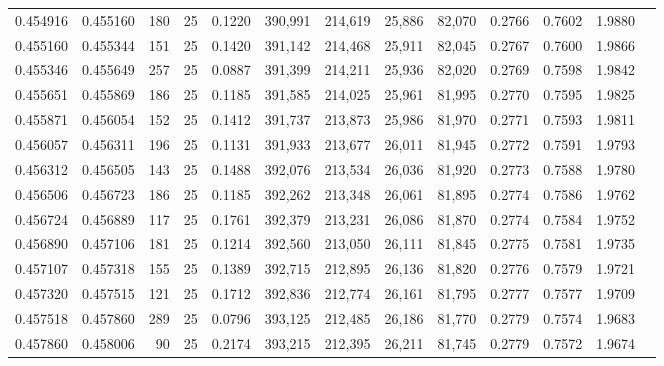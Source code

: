 \begin{tabular}{rrrrrrrrrrrrr}
0.454916 & 0.455160 &   180 &  25 &                                     0.1220 & 390,991 & 214,619 &  25,886 &  82,070 & 0.2766 & 0.7602 & 1.9880 \\
0.455160 & 0.455344 &   151 &  25 &                                     0.1420 & 391,142 & 214,468 &  25,911 &  82,045 & 0.2767 & 0.7600 & 1.9866 \\
0.455346 & 0.455649 &   257 &  25 &                                     0.0887 & 391,399 & 214,211 &  25,936 &  82,020 & 0.2769 & 0.7598 & 1.9842 \\
0.455651 & 0.455869 &   186 &  25 &                                     0.1185 & 391,585 & 214,025 &  25,961 &  81,995 & 0.2770 & 0.7595 & 1.9825 \\
0.455871 & 0.456054 &   152 &  25 &                                     0.1412 & 391,737 & 213,873 &  25,986 &  81,970 & 0.2771 & 0.7593 & 1.9811 \\
0.456057 & 0.456311 &   196 &  25 &                                     0.1131 & 391,933 & 213,677 &  26,011 &  81,945 & 0.2772 & 0.7591 & 1.9793 \\
0.456312 & 0.456505 &   143 &  25 &                                     0.1488 & 392,076 & 213,534 &  26,036 &  81,920 & 0.2773 & 0.7588 & 1.9780 \\
0.456506 & 0.456723 &   186 &  25 &                                     0.1185 & 392,262 & 213,348 &  26,061 &  81,895 & 0.2774 & 0.7586 & 1.9762 \\
0.456724 & 0.456889 &   117 &  25 &                                     0.1761 & 392,379 & 213,231 &  26,086 &  81,870 & 0.2774 & 0.7584 & 1.9752 \\
0.456890 & 0.457106 &   181 &  25 &                                     0.1214 & 392,560 & 213,050 &  26,111 &  81,845 & 0.2775 & 0.7581 & 1.9735 \\
0.457107 & 0.457318 &   155 &  25 &                                     0.1389 & 392,715 & 212,895 &  26,136 &  81,820 & 0.2776 & 0.7579 & 1.9721 \\
0.457320 & 0.457515 &   121 &  25 &                                     0.1712 & 392,836 & 212,774 &  26,161 &  81,795 & 0.2777 & 0.7577 & 1.9709 \\
0.457518 & 0.457860 &   289 &  25 &                                     0.0796 & 393,125 & 212,485 &  26,186 &  81,770 & 0.2779 & 0.7574 & 1.9683 \\
0.457860 & 0.458006 &    90 &  25 &                                     0.2174 & 393,215 & 212,395 &  26,211 &  81,745 & 0.2779 & 0.7572 & 1.9674 \\

\end{tabular}
